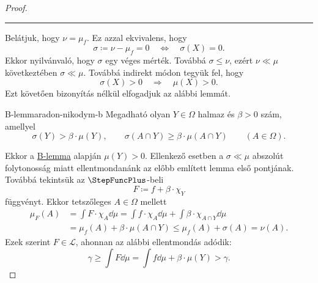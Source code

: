 \documentclass[
]{elteikthesis}[2024/04/26]
\begin{document}
\begin{proof}
		\vspace{6pt}
		\hrule
		\vspace{6pt}
		
		Belátjuk, hogy \( \nu = \mu_f \). Ez azzal ekvivalens, hogy
		\[
			\sigma \coloneq \nu - \mu_f = 0 
			\quad \iff \quad
			\sigma(X) = 0.
		\]
		Ekkor nyilvánvaló, hogy \( \sigma \) egy véges mérték.
		Továbbá \( \sigma \leq \nu \), ezért \( \nu \ll \mu \) következtében \( \sigma \ll \mu \).
		Továbbá indirekt módon tegyük fel, hogy
		\[
			\sigma(X) > 0
			\quad \Longrightarrow \quad
			\mu(X) > 0.
		\]
		Ezt követően bizonyítás nélkül elfogadjuk az alábbi lemmát.
		\begin{lemma}{B-lemma}{radon-nikodym-b}
			Megadható olyan \( Y \in \Omega \) halmaz és \( \beta > 0 \) szám, 
			amellyel %
			\[
				\sigma(Y) > \beta \cdot \mu(Y), \qquad
				\sigma(A \cap Y) \geq \beta \cdot \mu(A \cap Y)
				\qquad (A \in \Omega).
			\]
		\end{lemma}
		
		\newpage
		Ekkor a \hyperref[lem:radon-nikodym-b]{B-lemma} alapján \( \mu(Y) >  0 \).
		Ellenkező esetben a \( \sigma \ll \mu \) abszolút folytonosság miatt ellentmondanánk az előbb említett lemma első pontjának.
		Továbbá tekintsük az \( \StepFuncPlus \)-beli
		\[
			F \coloneq f + \beta \cdot \chi_Y 
		\]
		függvényt. Ekkor tetszőleges \( A \in \Omega \) mellett
		\begin{align*}
			\mu_F(A)
			&= \int F {\cdot} \chi_A \dd{\mu} 
			 = \int f {\cdot} \chi_A \dd{\mu} + \int \beta {\cdot} \chi_{A \cap Y} \dd{\mu} \\[3pt]
			&= \mu_f(A) + \beta {\cdot} \mu(A \cap Y)
			\leq \mu_f(A) + \sigma(A) = \nu(A).
		\end{align*}
		Ezek szerint \( F \in \mathcal{L} \), ahonnan az alábbi ellentmondás adódik:
		\[
			\gamma \geq 
			\int F \dd{\mu} = 
			\int f \dd{\mu} + \beta \cdot \mu(Y) > \gamma.
		\]
		
		
	\end{proof}
	
\end{document}
